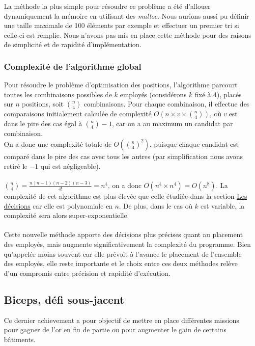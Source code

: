 La méthode la plus simple pour résoudre ce problème a été d'allouer dynamiquement la mémoire en utilisant des \textit{malloc}. Nous aurions aussi pu définir une taille maximale de 100 éléments par exemple et effectuer un premier tri si celle-ci est remplie. Nous n'avons pas mis en place cette méthode pour des raisons de simplicité et de rapidité d'implémentation.

\subsubsection{Complexité de l'algorithme global}
Pour résoudre le problème d'optimisation des positions, l'algorithme parcourt toutes les combinaisons possibles de \(k\) employés (considérons \(k\) fixé à 4), placés sur \(n\) positions, soit \(\binom{n}{4}\) combinaisons. Pour chaque combinaison, il effectue des comparaisons initialement calculée de complexité \(O(n \times v \times \binom{n}{4})\), où \(v\) est dans le pire des cas égal à \(\binom{n}{4}-1\), car on a au maximum un candidat par combinaison.\\
On a donc une complexité totale de \(O(\binom{n}{4}^2)\), puisque chaque candidat est comparé dans le pire des cas avec tous les autres (par simplification nous avons retiré le \(-1\) qui est négligeable).\\ \\
\( \binom{n}{4} = \frac{n(n-1)(n-2)(n-3)}{4!} = n^4\), on a donc \(O(n^4 \times n^4) = O(n^8).\)
La complexité de cet algorithme est plus élevée que celle étudiée dans la section \hyperref[sec:dec]{\uline{Les décisions}} car elle est polynomiale en \( n \). De plus, dans le cas où \( k \) est variable, la complexité sera alors super-exponentielle.\\ \\
Cette nouvelle méthode apporte des décisions plus précises quant au placement des employés, mais augmente significativement la complexité du programme. Bien qu'appelée moins souvent car elle prévoit à l'avance le placement de l'ensemble des employés, elle reste importante et le choix entre ces deux méthodes relève d'un compromis entre précision et rapidité d'exécution.

\subsection*{Biceps, défi sous-jacent}
\label{sec:bds}
Ce dernier achievement a pour objectif de mettre en place différentes missions pour gagner de l'or en fin de partie ou pour augmenter le gain de certains bâtiments.
